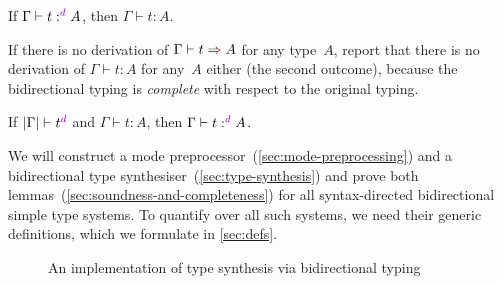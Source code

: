 \begin{lemma}[Soundness]
If\/ $\Gamma \vdash t :^\dir{d} A$, then $\Gamma \vdash t : A$.
\end{lemma}

If there is no derivation of $\Gamma \vdash t \syn A$ for any type~$A$, report that there is no derivation of $\Gamma \vdash t : A$ for any~$A$ either (the second outcome), because the bidirectional typing is \emph{complete} with respect to the original typing.

\begin{lemma}[Completeness]
If\/ $|\Gamma| \vdash t^\dir{d}$ and\/ $\Gamma \vdash t : A$, then $\Gamma \vdash t :^\dir{d} A$.
\end{lemma}

We will construct a mode preprocessor~(\cref{sec:mode-preprocessing}) and a bidirectional type synthesiser~(\cref{sec:type-synthesis}) and prove both lemmas~(\cref{sec:soundness-and-completeness}) for all syntax-directed bidirectional simple type systems.
To quantify over all such systems, we need their generic definitions, which we formulate in \cref{sec:defs}.

\begin{figure}
  \caption{An implementation of type synthesis via bidirectional typing}
\end{figure}

